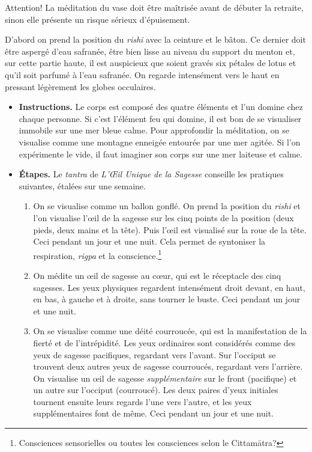 \documentclass[11pt,a4paper]{article}
\begin{document}
Attention! La méditation du vase doit être maîtrisée avant de débuter
la retraite, sinon elle présente un risque sérieux d'épuisement.

D'abord on prend la position du \emph{rishi} avec la ceinture et le
bâton. Ce dernier doit être aspergé d'eau safranée, être bien lisse au
niveau du support du menton et, sur cette partie haute, il est
auspicieux que soient gravés six pétales de lotus et qu'il soit
parfumé à l'eau safranée. On regarde intensément vers le haut en
pressant légèrement les globes occulaires.
\begin{itemize}

  \item \textbf{Instructions.} Le corps est composé des quatre
  éléments et l'un domine chez chaque personne. Si c'est l'élément feu
  qui domine, il est bon de se visualiser immobile sur une mer bleue
  calme. Pour approfondir la méditation, on se visualise comme une
  montagne enneigée entourée par une mer agitée. Si l'on expérimente
  le vide, il faut imaginer son corps sur une mer laiteuse et calme.

  \item \textbf{Étapes.} Le \emph{tantra} de \emph{L'{\OE}il Unique de la
  Sagesse} conseille les pratiques suivantes, étalées sur une semaine.
  \begin{enumerate}

    \item On se visualise comme un ballon gonflé. On prend la position
    du \emph{rishi} et l'on visualise l'{\oe}il de la sagesse sur les
    cinq points de la position (deux pieds, deux mains et la
    tête). Puis l'{\oe}il est visualisé sur la roue de la tête. Ceci
    pendant un jour et une nuit. Cela permet de syntoniser la
    respiration, \emph{rigpa} et la conscience.\footnote{Consciences
    sensorielles ou toutes les consciences selon le Cittam\=atra?}

    \item On médite un {\oe}il de sagesse au c{\oe}ur, qui est le
    réceptacle des cinq sagesses. Les yeux physiques regardent
    intensément droit devant, en haut, en bas, à gauche et à droite,
    sans tourner le buste. Ceci pendant un jour et une nuit.

    \item On se visualise comme une déité courroucée, qui est la
    manifestation de la fierté et de l'intrépidité. Les yeux
    ordinaires sont considérés comme des yeux de sagesse pacifiques,
    regardant vers l'avant. Sur l'occiput se trouvent deux autres yeux
    de sagesse courroucés, regardant vers l'arrière. On visualise un
    {\oe}il de sagesse \emph{supplémentaire} sur le front (pacifique)
    et un autre sur l'occiput (courroucé). Les deux paires d'yeux
    initiales tournent ensuite leurs regards l'une vers l'autre, et
    les yeux supplémentaires font de même. Ceci pendant un jour et une
    nuit.


\end{enumerate}
\end{itemize}
\end{document}
